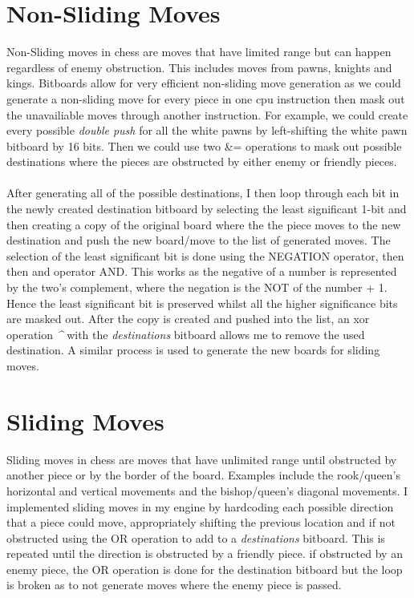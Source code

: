\section{Non-Sliding Moves}
Non-Sliding moves in chess are moves that have limited range but can happen regardless of enemy obstruction. This includes moves from pawns, knights and kings. Bitboards allow for very efficient non-sliding move generation as we could generate a non-sliding move for every piece in one cpu instruction then mask out the unavailiable moves through another instruction. For example, we could create every possible \textit{double push} for all the white pawns by left-shifting the white pawn bitboard by 16 bits. Then we could use two \&= operations to mask out possible destinations where the pieces are obstructed by either enemy or friendly pieces.\\\\
After generating all of the possible destinations, I then loop through each bit in the newly created destination bitboard by selecting the least significant 1-bit and then creating a copy of the original board where the the piece moves to the new destination and push the new board/move to the list of generated moves. The selection of the least significant bit is done using the NEGATION operator, then then and operator AND. This works as the negative of a number is represented by the two's complement, where the negation is the NOT of the number + 1. Hence the least significant bit is preserved whilst all the higher significance bits are masked out. After the copy is created and pushed into the list, an xor operation \textit{\^} with the \textit{destinations} bitboard allows me to remove the used destination. A similar process is used to generate the new boards for sliding moves.
\section{Sliding Moves}
Sliding moves in chess are moves that have unlimited range until obstructed by another piece or by the border of the board. Examples include the rook/queen's horizontal and vertical movements and the bishop/queen's diagonal movements. I implemented sliding moves in my engine by hardcoding each possible direction that a piece could move, appropriately shifting the previous location and if not obstructed using the OR operation to add to a \textit{destinations} bitboard. This is repeated until the direction is obstructed by a friendly piece. if obstructed by an enemy piece, the OR operation is done for the destination bitboard but the loop is broken as to not generate moves where the enemy piece is passed.